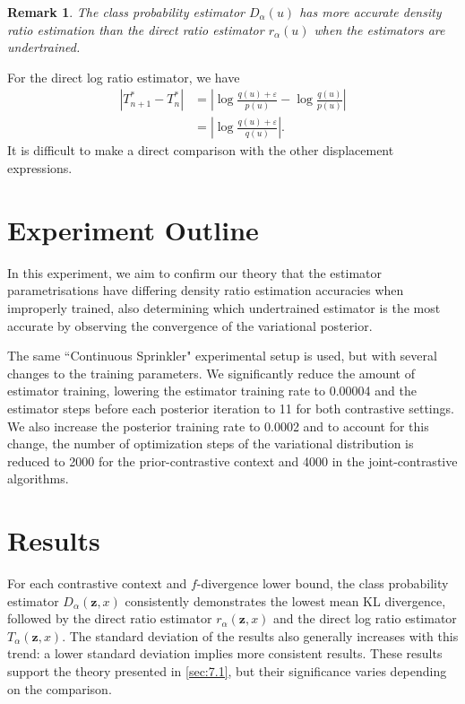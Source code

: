 \documentclass[honours,12pt]{unswthesis}
\newtheorem{remark}[theorem]{Remark}
\numberwithin{equation}{section}
\theoremstyle{definition}
\begin{document}
\begin{remark}
The class probability estimator $D_\alpha(u)$ has more accurate density ratio estimation than the direct ratio estimator $r_\alpha(u)$ when the estimators are undertrained.
\end{remark}
For the direct log ratio estimator, we have
\begin{align*}
|T^*_{n+1}-T^*_{n}|&=\left|\log \frac{q(u)+\varepsilon}{p(u)}-\log \frac{q(u)}{p(u)}\right|\\
&=\left|\log \frac{q(u)+\varepsilon}{q(u)}\right|.
\end{align*}
It is difficult to make a direct comparison with the other displacement expressions.

\section{Experiment Outline}
In this experiment, we aim to confirm our theory that the estimator parametrisations have differing density ratio estimation accuracies when improperly trained, also determining which undertrained estimator is the most accurate by observing the convergence of the variational posterior.

The same ``Continuous Sprinkler" experimental setup is used, but with several changes to the training parameters. We significantly reduce the amount of estimator training, lowering the estimator training rate to 0.00004 and the estimator steps before each posterior iteration to 11 for both contrastive settings. We also increase the posterior training rate to 0.0002 and to account for this change, the number of optimization steps of the variational distribution is reduced to 2000 for the prior-contrastive context and 4000 in the joint-contrastive algorithms. 
\section{Results}
For each contrastive context and $f$-divergence lower bound, the class probability estimator $D_\alpha(\bm{z},x)$ consistently demonstrates the lowest mean KL divergence, followed by the direct ratio estimator $r_\alpha (\bm{z},x)$ and the direct log ratio estimator $T_\alpha(\bm{z},x)$. The standard deviation of the results also generally increases with this trend: a lower standard deviation implies more consistent results. These results support the theory presented in \autoref{sec:7.1}, but their significance varies depending on the comparison.
\end{document}
